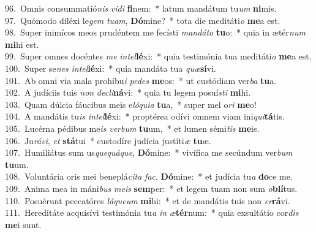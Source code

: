 {96.~}Omnis consummatió\textit{nis} \textit{vi}\textit{di} \textbf{fi}nem:~* latum mandátum tu\textit{um} \textbf{ni}mis.\\
{97.~}Quómodo diléxi le\textit{gem} \textit{tu}\textit{am}, \textbf{Dó}mine?~* tota die meditáti\textit{o} \textbf{me}a est.\\
{98.~}Super inimícos meos prudéntem me fecísti \textit{man}\textit{dá}\textit{to} \textbf{tu}o:~* quia in ætér\textit{num} \textbf{mi}hi est.\\
{99.~}Super omnes docéntes \textit{me} \textit{in}\textit{tel}\textbf{lé}xi:~* quia testimónia tua meditáti\textit{o} \textbf{me}a est.\\
{100.~}Super se\textit{nes} \textit{in}\textit{tel}\textbf{lé}xi:~* quia mandáta tua \textit{quæ}\textbf{sí}vi.\\
{101.~}Ab omni via mala prohíbu\textit{i} \textit{pe}\textit{des} \textbf{me}os:~* ut custódiam ver\textit{ba} \textbf{tu}a.\\
{102.~}A judíciis tuis \textit{non} \textit{de}\textit{cli}\textbf{ná}vi:~* quia tu legem posuí\textit{sti} \textbf{mi}hi.\\
{103.~}Quam dúlcia fáucibus meis e\textit{ló}\textit{qui}\textit{a} \textbf{tu}a,~* super mel o\textit{ri} \textbf{me}o!\\
{104.~}A mandátis tu\textit{is} \textit{in}\textit{tel}\textbf{lé}xi:~* proptérea odívi omnem viam ini\textit{qui}\textbf{tá}tis.\\
{105.~}Lucérna pédibus me\textit{is} \textit{ver}\textit{bum} \textbf{tu}um,~* et lumen sémi\textit{tis} \textbf{me}is.\\
{106.~}Ju\textit{rá}\textit{vi}, \textit{et} \textbf{stá}tui~* custodíre judícia justíti\textit{æ} \textbf{tu}æ.\\
{107.~}Humiliátus sum us\textit{que}\textit{quá}\textit{que}, \textbf{Dó}mine:~* vivífica me secúndum ver\textit{bum} \textbf{tu}um.\\
{108.~}Voluntária oris mei beneplá\textit{ci}\textit{ta} \textit{fac}, \textbf{Dó}mine:~* et judícia tu\textit{a} \textbf{do}ce me.\\
{109.~}Anima mea in máni\textit{bus} \textit{me}\textit{is} \textbf{sem}per:~* et legem tuam non sum \textit{o}\textbf{blí}tus.\\
{110.~}Posuérunt peccatóres \textit{lá}\textit{que}\textit{um} \textbf{mi}hi:~* et de mandátis tuis non \textit{er}\textbf{rá}vi.\\
{111.~}Hereditáte acquisívi testimónia tu\textit{a} \textit{in} \textit{æ}\textbf{tér}num:~* quia exsultátio cor\textit{dis} \textbf{me}i sunt.\\
